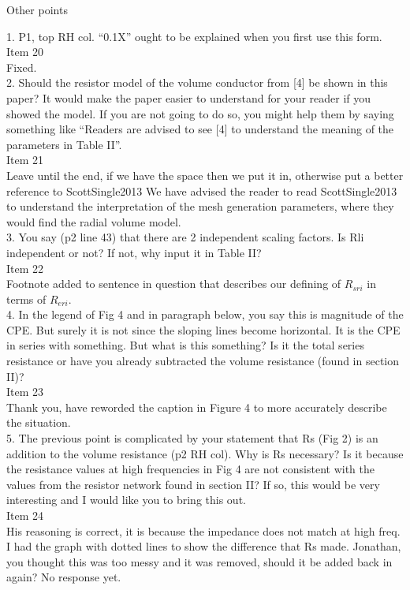 \documentclass[journal, a4paper]{IEEEtran}
\begin{document}
{Other points

1. P1, top RH col. ``0.1X'' ought to be explained when you first use this form.\\
{\color{OliveGreen}
    Item 20\\
    Fixed.
}\\

2. Should the resistor model of the volume conductor from [4] be shown in this paper? It would make the paper easier to understand for your reader if you showed the model. If you are not going to do so, you might help them by saying something like ``Readers are advised to see [4] to understand the meaning of the parameters in Table II''.\\
{\color{OliveGreen}
    Item 21\\
    {\color{Red} Leave until the end, if we have the space then we put it in, otherwise put a better reference to ScottSingle2013}
    We have advised the reader to read ScottSingle2013 to understand the interpretation of the mesh generation parameters, where they would find the radial volume model.
}\\

3. You say (p2 line 43) that there are 2 independent scaling factors. Is Rli independent or not? If not, why input it in Table II?\\
{\color{OliveGreen}
    Item 22\\
    Footnote added to sentence in question that describes our defining of $R_{sri}$ in terms of $R_{eri}$. 
}\\

4. In the legend of Fig 4 and in paragraph below, you say this is magnitude of the CPE. But surely it is not since the sloping lines become horizontal. It is the CPE in series with something. But what is this something? Is it the total series resistance or have you already subtracted the volume resistance (found in section II)?\\
{\color{OliveGreen}
    Item 23\\
    Thank you, have reworded the caption in Figure 4 to more accurately describe the situation.
}\\

5. The previous point is complicated by your statement that Rs (Fig 2) is an addition to the volume resistance (p2 RH col). Why is Rs necessary? Is it because the resistance values at high frequencies in Fig 4 are not consistent with the values from the resistor network found in section II? If so, this would be very interesting and I would like you to bring this out.\\
{\color{OliveGreen} 
    Item 24\\
    {\color{Red} His reasoning is correct, it is because the impedance does not match at high freq. I had the graph with dotted lines to show the difference that Rs made. Jonathan, you thought this was too messy and it was removed, should it be added back in again?}
    No response yet.
}\\

}
\end{document}
